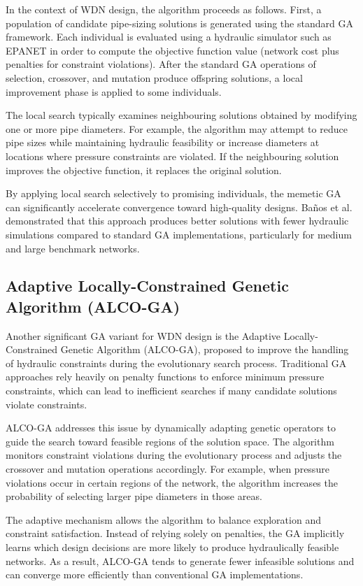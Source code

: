\documentclass[12pt, a4paper]{article}
\begin{document}
In the context of WDN design, the algorithm proceeds as follows. First, a population of candidate pipe-sizing solutions is generated using the standard GA framework. Each individual is evaluated using a hydraulic simulator such as EPANET in order to compute the objective function value (network cost plus penalties for constraint violations). After the standard GA operations of selection, crossover, and mutation produce offspring solutions, a local improvement phase is applied to some individuals.

The local search typically examines neighbouring solutions obtained by modifying one or more pipe diameters. For example, the algorithm may attempt to reduce pipe sizes while maintaining hydraulic feasibility or increase diameters at locations where pressure constraints are violated. If the neighbouring solution improves the objective function, it replaces the original solution.

By applying local search selectively to promising individuals, the memetic GA can significantly accelerate convergence toward high-quality designs. Ba\~nos et al. demonstrated that this approach produces better solutions with fewer hydraulic simulations compared to standard GA implementations, particularly for medium and large benchmark networks.

\subsection*{Adaptive Locally-Constrained Genetic Algorithm (ALCO-GA)}

Another significant GA variant for WDN design is the Adaptive Locally-Constrained Genetic Algorithm (ALCO-GA), proposed to improve the handling of hydraulic constraints during the evolutionary search process\cite{ref15}. Traditional GA approaches rely heavily on penalty functions to enforce minimum pressure constraints, which can lead to inefficient searches if many candidate solutions violate constraints.

ALCO-GA addresses this issue by dynamically adapting genetic operators to guide the search toward feasible regions of the solution space. The algorithm monitors constraint violations during the evolutionary process and adjusts the crossover and mutation operations accordingly. For example, when pressure violations occur in certain regions of the network, the algorithm increases the probability of selecting larger pipe diameters in those areas.

The adaptive mechanism allows the algorithm to balance exploration and constraint satisfaction. Instead of relying solely on penalties, the GA implicitly learns which design decisions are more likely to produce hydraulically feasible networks. As a result, ALCO-GA tends to generate fewer infeasible solutions and can converge more efficiently than conventional GA implementations.
\end{document}
